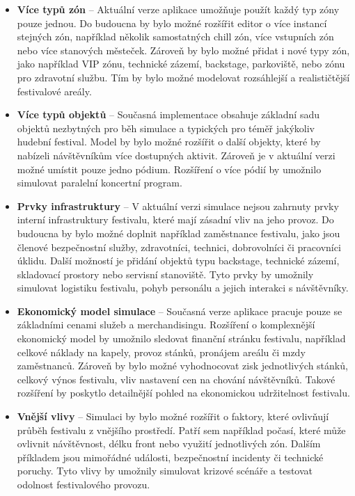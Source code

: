 \documentclass[
  program=itp,
  biblatex,
  figures=false,
  glossaries,
  index
]{kidiplom}
\begin{document}
\begin{itemize}

\item \textbf{Více typů zón} – Aktuální verze aplikace umožňuje použít každý typ zóny pouze jednou. Do budoucna by bylo možné rozšířit editor o více instancí stejných zón, například několik samostatných chill zón, více vstupních zón nebo více stanových městeček. Zároveň by bylo možné přidat i nové typy zón, jako například VIP zónu, technické zázemí, backstage, parkoviště, nebo zónu pro zdravotní službu. Tím by bylo možné modelovat rozsáhlejší a realističtější festivalové areály.

\item \textbf{Více typů objektů} – Současná implementace obsahuje základní sadu objektů nezbytných pro běh simulace a typických pro téměř jakýkoliv hudební festival. Model by bylo možné rozšířit o další objekty, které by nabízeli návštěvníkům více dostupných aktivit. Zároveň je v aktuální verzi možné umístit pouze jedno pódium. Rozšíření o více pódií by umožnilo simulovat paralelní koncertní program.

\item \textbf{Prvky infrastruktury} – V aktuální verzi simulace nejsou zahrnuty prvky interní infrastruktury festivalu, které mají zásadní vliv na jeho provoz. Do budoucna by bylo možné doplnit například zaměstnance festivalu, jako jsou členové bezpečnostní služby, zdravotníci, technici, dobrovolníci či pracovníci úklidu. Další možností je přidání objektů typu backstage, technické zázemí, skladovací prostory nebo servisní stanoviště. Tyto prvky by umožnily simulovat logistiku festivalu, pohyb personálu a jejich interakci s návštěvníky.

\item \textbf{Ekonomický model simulace} – Současná verze aplikace pracuje pouze se základními cenami služeb a merchandisingu. Rozšíření o komplexnější ekonomický model by umožnilo sledovat finanční stránku festivalu, například celkové náklady na kapely, provoz stánků, pronájem areálu či mzdy zaměstnanců. Zároveň by bylo možné vyhodnocovat zisk jednotlivých stánků, celkový výnos festivalu, vliv nastavení cen na chování návštěvníků. Takové rozšíření by poskytlo detailnější pohled na ekonomickou udržitelnost festivalu.

\item \textbf{Vnější vlivy} – Simulaci by bylo možné rozšířit o faktory, které ovlivňují průběh festivalu z vnějšího prostředí. Patří sem například počasí, které může ovlivnit návštěvnost, délku front nebo využití jednotlivých zón. Dalším příkladem jsou mimořádné události, bezpečnostní incidenty či technické poruchy. Tyto vlivy by umožnily simulovat krizové scénáře a testovat odolnost festivalového provozu.


\end{itemize}
\end{document}
